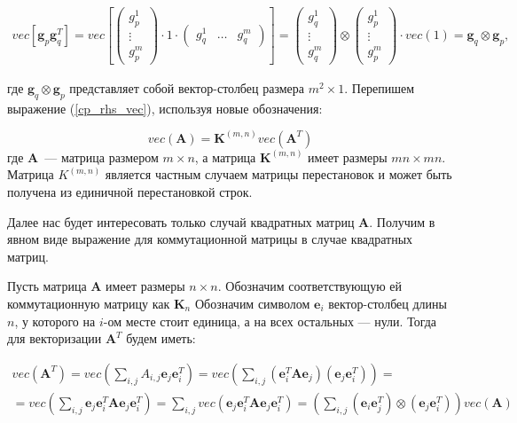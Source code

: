\begin{gather}
    vec[\mathbf{g}_p \mathbf{g}_q^T] = vec\left[
        \begin{pmatrix}
            g_p^1 \\
            \vdots \\
            g_p^m
        \end{pmatrix}
    \cdot 1 \cdot
    \begin{pmatrix}
        g_q^1 & \dots & g_q^m
    \end{pmatrix}
    \right] = %
    \begin{pmatrix}
        g_q^1 \\
        \vdots \\
        g_q^m
    \end{pmatrix}
    \otimes
    \begin{pmatrix}
        g_p^1 \\
        \vdots \\
        g_p^m
    \end{pmatrix}
    \cdot
    vec(1) =
    \mathbf{g}_q \otimes \mathbf{g}_p,
\end{gather}

где $\mathbf{g}_q \otimes \mathbf{g}_p$ представляет собой вектор-столбец размера $m^2 \times 1$.
Перепишем выражение (\ref{cp_rhs_vec}), используя новые обозначения:

\begin{equation}
    vec(\mathbf{A}) = \mathbf{K}^{(m,n)} vec(\mathbf{A}^T)
    \label{eq:commutation_matrix_def}
\end{equation}
где $\mathbf{A}$~--- матрица размером $m \times n$, а матрица $\mathbf{K}^{(m,n)}$ имеет размеры
$mn \times mn$.
Матрица $K^{(m,n)}$ является частным случаем матрицы перестановок и
может быть получена из единичной перестановкой строк.

Далее нас будет интересовать только случай квадратных матриц $\mathbf{A}$.
Получим в явном виде выражение для коммутационной матрицы в случае квадратных матриц.

Пусть матрица $\mathbf{A}$ имеет размеры $n \times n$. Обозначим соответствующую ей коммутационную матрицу
как $\mathbf{K}_n$
Обозначим символом $\mathbf{e}_i$ вектор-столбец длины $n$, у которого на $i$-ом месте стоит
единица, а на всех остальных --- нули. Тогда для векторизации $\mathbf{A}^T$ будем иметь:

\begin{multline}
    vec\left(\mathbf{A}^T\right) = vec\left(\sum_{i,j} A_{i,j} \mathbf{e}_j \mathbf{e}_i^T\right) =
    vec\left(\sum_{i,j} (\mathbf{e}_i^T \mathbf{A} \mathbf{e}_j)(\mathbf{e}_j \mathbf{e}_i^T)\right) = \\
  = vec\left(\sum_{i,j} \mathbf{e}_j \mathbf{e}_i^T \mathbf{A} \mathbf{e}_j\mathbf{e}_i^T\right) =
    \sum_{i,j} vec\left(\mathbf{e}_j \mathbf{e}_i^T \mathbf{A} \mathbf{e}_j \mathbf{e}_i^T\right) =
    \left(\sum_{i,j} (\mathbf{e}_i \mathbf{e}_j^T) \otimes (\mathbf{e}_j \mathbf{e}_i^T) \right)vec(\mathbf{A})
\end{multline}

